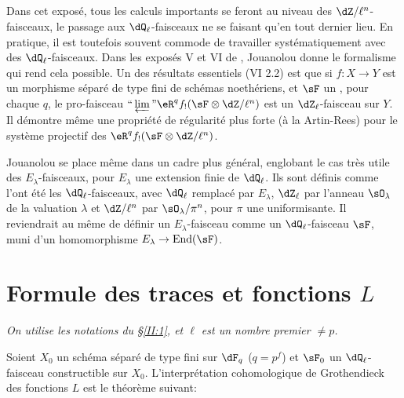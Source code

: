 \subsection{}\label{II:2-11}

Dans cet exposé, tous les calculs importants se feront au niveau des 
$\dZ/\ell^n$-faisceaux, le passage aux $\dQ_\ell$-faisceaux ne se faisant qu'en 
tout dernier lieu. En pratique, il est toutefois souvent commode de travailler 
systématiquement avec des $\dQ_\ell$-faisceaux. Dans les exposés 
V et VI de \cite{sga5}, Jouanolou donne le formalisme qui rend cela possible. 
Un des résultats essentiels (VI 2.2) est que si $f:X\to Y$ est un morphisme 
séparé de type fini de schémas noethériens, et $\sF$ un 
, pour chaque $q$, le pro-faisceau 
$\text{``}\varprojlim\text{''}\eR^q f_! (\sF\otimes\dZ/\ell^n)$ est un 
$\dZ_\ell$-faisceau sur $Y$. Il démontre même une propriété de 
régularité plus forte (à la Artin-Rees) pour le système projectif des 
$\eR^q f_!(\sF\otimes\dZ/\ell^n)$. 

Jouanolou se place même dans un cadre plus général, englobant le cas 
très utile des $E_\lambda$-faisceaux, pour $E_\lambda$ une extension finie de 
$\dQ_\ell$. Ils sont définis comme l'ont été les $\dQ_\ell$-faisceaux, 
avec $\dQ_\ell$ remplacé par $E_\lambda$, $\dZ_\ell$ par l'anneau 
$\sO_\lambda$ de la valuation $\lambda$ et $\dZ/\ell^n$ par 
$\sO_\lambda/\pi^n$, pour $\pi$ une uniformisante. Il reviendrait au même de 
définir un $E_\lambda$-faisceau comme un $\dQ_\ell$-faisceau $\sF$, muni 
d'un homomorphisme $E_\lambda\to\operatorname{End}(\sF)$. 










\section{Formule des traces et fonctions \texorpdfstring{$L$}{L}}\label{II:3}

\emph{On utilise les notations du \S\ref{II:1}, et $\ell$ est un nombre premier 
$\ne p$.}

Soient $X_0$ un schéma séparé de type fini sur $\dF_q$ ($q=p^f$) et 
$\sF_0$ un $\dQ_\ell$-faisceau constructible sur $X_0$. L'interprétation 
cohomologique de Grothendieck des fonctions $L$ est le théorème suivant: 





